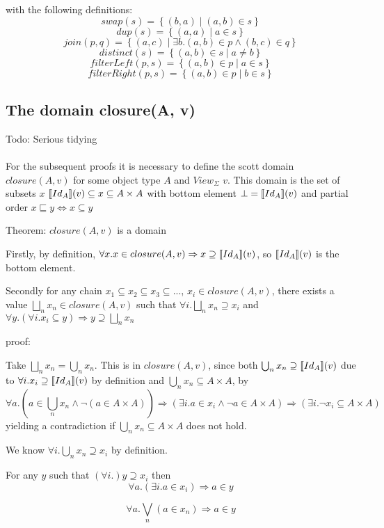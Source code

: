 \documentclass[twoside,a4paper,11pt]{article}
\newcommand{\db}[1]{{\bf [\![}#1{\bf ]\!]}}
\newcommand{\deno}[1]{\db{#1}(v)}
\newcommand{\setComp}[2]{\left\lbrace #1 \mid #2 \right\rbrace}
\newcommand{\clos}[0]{closure(A, v)}
\begin{document}
with the following definitions:
$$ swap(s) = \setComp{(b,a)}{(a, b) \in s}$$
$$ dup(s) = \setComp{(a,a)}{a \in s}$$
$$ join(p, q) = \setComp{(a, c)}{ \exists b. (a, b) \in p \wedge (b, c) \in q}$$
$$ distinct(s) = \setComp{(a, b) \in s} { a \neq b} $$
$$ filterLeft(p, s) = \setComp{(a, b) \in p}{a \in s}$$
$$ filterRight(p, s) = \setComp{(a, b) \in p}{b \in s}$$


\subsection{The domain \clos}

Todo: Serious tidying \\ \\

For the subsequent proofs it is necessary to define the scott domain $\clos$ for some
object type $A$ and $View_{\Sigma}$ $v$. This domain is the set of subsets $x$ $\deno{Id_A} \subseteq x \subseteq A \times A$ with bottom element $\bot = \deno{Id_A}$ and partial order $x \sqsubseteq y \Leftrightarrow x \subseteq y$

Theorem: $\clos$ is a domain

Firstly, by definition, $\forall x. x \in \clos \Rightarrow x \supseteq \deno{Id_A}$, so $\deno{Id_A}$ is the bottom element.

Secondly for any chain $ x_1 \subseteq x_2 \subseteq x_3 \subseteq ...$, $x_i \in \clos$, there exists a value $\bigsqcup_n x_n \in \clos$ such that $\forall i. \bigsqcup_n x_n \supseteq x_i$ and $\forall y. (\forall i. x_i \subseteq y) \Rightarrow y \supseteq \bigsqcup_n x_n$

proof:

Take $\bigsqcup_n x_n = \bigcup_n x_n$. This is in $\clos$, since both $\bigcup_n x_n \supseteq \deno{Id_A}$ due to $\forall i. x_i \supseteq \deno{Id_A}$ by definition and $\bigcup_n x_n \subseteq A \times A$, by $$\forall a. (a \in \bigcup_n x_n \wedge \neg (a \in A \times A)) \Rightarrow (\exists i. a \in x_i \wedge \neg a \in A \times A ) \Rightarrow (\exists i. \neg x_i \subseteq A \times A)$$ yielding a contradiction if $\bigcup_n x_n \subseteq A \times A$ does not hold.

We know $\forall i. \bigcup_n x_n \supseteq x_i$ by definition.

For any $y$ such that $(\forall i.) y \supseteq x_i$ then $$\forall a. (\exists i. a \in x_i) \Rightarrow a \in y$$

$$\forall a. \bigvee_n (a \in x_n) \Rightarrow a \in y$$
\end{document}
